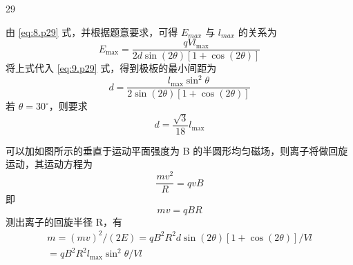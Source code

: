 \begin{solution}{29}
\begin{subsolution}
    由 \eqref{eq:8.p29} 式，并根据题意要求，可得 $E_{max}$ 与 $l_{max}$ 的关系为
    \begin{equation}
      E_{\max} = \frac{q V l_{\max}}{2 d \sin (2 \theta) [ 1 + \cos (2 \theta) ]}
      \label{eq:10.p29}
    \end{equation}
    将上式代入 \eqref{eq:9.p29} 式，得到极板的最小间距为
    \begin{equation}
      d = \frac{l_{\max} \sin^{2} \theta}{2 \sin (2 \theta) [ 1 + \cos (2 \theta) ]}
      \label{eq:11.p29}
    \end{equation}
    若 $\theta = 30^{\circ}$，则要求
    \begin{equation}
      d = \frac{\sqrt{3}}{18} l_{\max}
      \label{eq:12.p29}
    \end{equation}
  \end{subsolution}
  \begin{subsolution}
    可以加如图所示的垂直于运动平面强度为 B 的半圆形均匀磁场，则离子将做回旋运动，其运动方程为
    \begin{equation}
      \frac{m v^{2}}{R} = q v B
      \label{eq:13.p29}
    \end{equation}
    即
    \begin{equation}
      m v = q B R
    \end{equation}
    测出离子的回旋半径 R，有
    \begin{equation}
      \begin{array}{l}
        m = (m v)^{2} / (2 E) = q B^{2} R^{2} d \sin (2 \theta) [ 1 + \cos (2 \theta) ] / V l \\
        = q B^{2} R^{2} l_{\max} \sin^{2} \theta / V l
      \end{array}
      \label{eq:14.p29}
    \end{equation}
  \end{subsolution}
\end{solution}